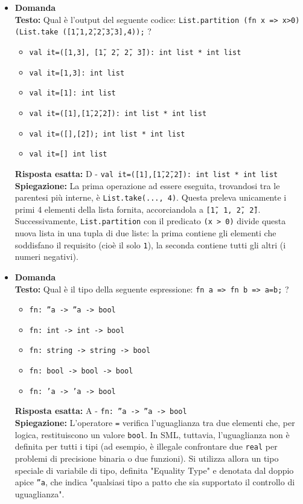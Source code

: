 \documentclass[12pt, a4paper]{article}
\newcounter{domandateoria}
\begin{document}
\begin{itemize}
    \item {}\textbf{Domanda \thedomandateoria} \\
    \textbf{Testo:} Qual è l'output del seguente codice: \texttt{List.partition (fn x => x>0) (List.take ([\~1,1,\~2,\~2,\~3,3],4));} ?
    \begin{itemize}
        \item[A)] \texttt{val it=([1,3], [\~1, \~2, \~2, \~3]): int list * int list}
        \item[B)] \texttt{val it=[1,3]: int list}
        \item[C)] \texttt{val it=[1]: int list}
        \item[D)] \texttt{val it=([1],[\~1,\~2,\~2]): int list * int list}
        \item[E)] \texttt{val it=([],[\~2]); int list * int list}
        \item[F)] \texttt{val it=[] int list}
    \end{itemize}
    \textbf{Risposta esatta:} D - \texttt{val it=([1],[\~1,\~2,\~2]): int list * int list} \\
    \textbf{Spiegazione:} La prima operazione ad essere eseguita, trovandosi tra le parentesi più interne, è \texttt{List.take(..., 4)}. Questa preleva unicamente i primi 4 elementi della lista fornita, accorciandola a \texttt{[\~1, 1, \~2, \~2]}. Successivamente, \texttt{List.partition} con il predicato \texttt{(x > 0)} divide questa nuova lista in una tupla di due liste: la prima contiene gli elementi che soddisfano il requisito (cioè il solo \texttt{1}), la seconda contiene tutti gli altri (i numeri negativi).
    \vspace{0.3cm}

    \item {}\textbf{Domanda \thedomandateoria} \\
    \textbf{Testo:} Qual è il tipo della seguente espressione: \texttt{fn a => fn b => a=b;} ?
    \begin{itemize}
        \item[A)] \texttt{fn: ''a -> ''a -> bool}
        \item[B)] \texttt{fn: int -> int -> bool}
        \item[C)] \texttt{fn: string -> string -> bool}
        \item[D)] \texttt{fn: bool -> bool -> bool}
        \item[E)] \texttt{fn: 'a -> 'a -> bool}
    \end{itemize}
    \textbf{Risposta esatta:} A - \texttt{fn: ''a -> ''a -> bool} \\
    \textbf{Spiegazione:} L'operatore \texttt{=} verifica l'uguaglianza tra due elementi che, per logica, restituiscono un valore \texttt{bool}. In SML, tuttavia, l'uguaglianza non è definita per tutti i tipi (ad esempio, è illegale confrontare due \texttt{real} per problemi di precisione binaria o due funzioni). Si utilizza allora un tipo speciale di variabile di tipo, definita "Equality Type" e denotata dal doppio apice \texttt{''a}, che indica "qualsiasi tipo a patto che sia supportato il controllo di uguaglianza".
    \vspace{0.3cm}


\end{itemize}
\end{document}
